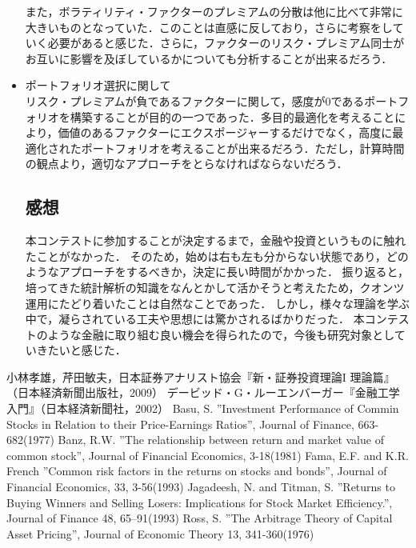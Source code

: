 ﻿\documentclass[a4paper]{jarticle}
\begin{document}
\begin{itemize}
\quad また，ボラティリティ・ファクターのプレミアムの分散は他に比べて非常に大きいものとなっていた．このことは直感に反しており，さらに考察をしていく必要があると感じた．さらに，ファクターのリスク・プレミアム同士がお互いに影響を及ぼしているかについても分析することが出来るだろう．

\item{ポートフォリオ選択に関して}\\
\quad リスク・プレミアムが負であるファクターに関して，感度が0であるポートフォリオを構築することが目的の一つであった．多目的最適化を考えることにより，価値のあるファクターにエクスポージャーするだけでなく，高度に最適化されたポートフォリオを考えることが出来るだろう．ただし，計算時間の観点より，適切なアプローチをとらなければならないだろう．

\subsection{感想}

\quad 本コンテストに参加することが決定するまで，金融や投資というものに触れたことがなかった．
そのため，始めは右も左も分からない状態であり，どのようなアプローチをするべきか，決定に長い時間がかかった．
振り返ると，培ってきた統計解析の知識をなんとかして活かそうと考えたため，クオンツ運用にたどり着いたことは自然なことであった．
しかし，様々な理論を学ぶ中で，凝らされている工夫や思想には驚かされるばかりだった．
本コンテストのような金融に取り組む良い機会を得られたので，今後も研究対象としていきたいと感じた．

\end{itemize}

\newpage

\begin{thebibliography}{30}
	 小林孝雄，芹田敏夫，日本証券アナリスト協会『新・証券投資理論I 理論篇』（日本経済新聞出版社，2009）
	 デービッド・G・ルーエンバーガー『金融工学入門』（日本経済新聞社，2002）
	 Basu, S. ''Investment Performance of Commin Stocks in Relation to their Price-Earnings Ratios'', Journal of Finance, 663-682(1977)
	 Banz, R.W. ''The relationship between return and market value of common stock'', Journal of Financial Economics, 3-18(1981)
	 Fama, E.F. and K.R. French ''Common risk factors in the returns on stocks and bonds'', Journal of Financial Economics, 33, 3-56(1993)
	 Jagadeesh, N. and Titman, S. ''Returns to Buying Winners and Selling Losers: Implications for Stock Market Efficiency.'', Journal of Finance 48, 65–91(1993)
	 Ross, S. ''The Arbitrage Theory of Capital Asset Pricing'', Journal of Economic Theory 13, 341-360(1976)
	
\end{thebibliography}
\end{document}
